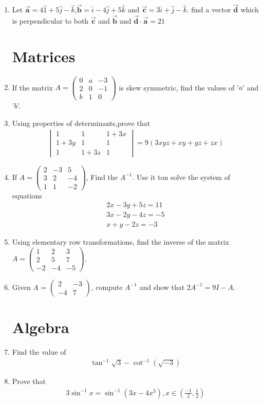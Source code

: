 \documentclass[10pt,-letter paper]{article}
\providecommand{\brak}[1]{\ensuremath{\left(#1\right)}}
\newcommand{\myvec}[1]{\ensuremath{\begin{pmatrix}#1\end{pmatrix}}}
\newcommand{\mydet}[1]{\ensuremath{\begin{vmatrix}#1\end{vmatrix}}}
\begin{document}
\begin{enumerate}
\item Let $\overrightarrow{\mathbf{a}}=4\hat{1}+5\hat{j}-\hat{k}$,$\overrightarrow{\mathbf{b}}=\hat{i}-4\hat{j}+5\hat{k}$ and $\overrightarrow{\mathbf{c}}=3\hat{i}+\hat{j}-\hat{k}$. find a vector $\overrightarrow{\mathbf{d}}$ which is perpendicular to both $\overrightarrow{\mathbf{c}}$ and $\overrightarrow{\mathbf{b}}$ and $\overrightarrow{\mathbf{d}}\cdot \overrightarrow{\mathbf{a}}=21$

\section{Matrices}

\item  If the matrix $A = \myvec{ 0 & a & -3 \\ 2 & 0 & -1 \\ b & 1 & 0 }$ is skew symmetric, find the values of '$a$' and '$b$'.

\item Using properties of determinants,prove that 
	\begin{align*}
		\mydet{1 & 1 & 1+3x \\ 1+3y & 1 & 1 \\ 1 & 1+3z & 1 }=9\brak{3xyz+xy+yz+zx}
	\end{align*}
\item If $A=\myvec{2 & -3 & 5 \\ 3 & 2 & -4 \\ 1 & 1 & -2}$, Find the $A^{-1}$. Use it ton solve the system of equations 
	\begin{align*}
		2x-3y+5z=11 \\
		3x-2y-4z=-5\\
		x+y-2z=-3
	\end{align*}
\item Using elementary row transformations, find the inverse of the matrix $A=\myvec{1 & 2 & 3 \\ 2 & 5 & 7 \\ -2 & -4 & -5}$.
\item Given $A$ = $\myvec{ 2 & -3 \\ -4 & 7 }$, compute $A^{-1}$ and show that $2A^{-1} = 9I-A$.
\section{Algebra}

\item Find the value of
	\begin{align*}
		\tan^{-1}\sqrt{3}-\cot^{-1}\brak{\sqrt{-3}}
	\end{align*}
 \item Prove that 
			\begin{align*}
		3\sin^{-1}x=\sin^{-1}\brak{3x-4x^3}, x\in\brak{\frac{-1}{2},\frac{1}{2}}
			\end{align*} 

\end{enumerate}
\end{document}
